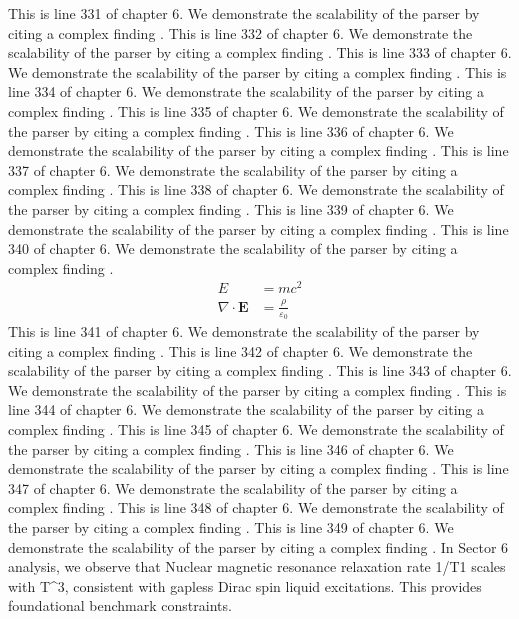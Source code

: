 This is line 331 of chapter 6. We demonstrate the scalability of the parser by citing a complex finding \cite{ref6_331}.
This is line 332 of chapter 6. We demonstrate the scalability of the parser by citing a complex finding \cite{ref6_332}.
This is line 333 of chapter 6. We demonstrate the scalability of the parser by citing a complex finding \cite{ref6_333}.
This is line 334 of chapter 6. We demonstrate the scalability of the parser by citing a complex finding \cite{ref6_334}.
This is line 335 of chapter 6. We demonstrate the scalability of the parser by citing a complex finding \cite{ref6_335}.
This is line 336 of chapter 6. We demonstrate the scalability of the parser by citing a complex finding \cite{ref6_336}.
This is line 337 of chapter 6. We demonstrate the scalability of the parser by citing a complex finding \cite{ref6_337}.
This is line 338 of chapter 6. We demonstrate the scalability of the parser by citing a complex finding \cite{ref6_338}.
This is line 339 of chapter 6. We demonstrate the scalability of the parser by citing a complex finding \cite{ref6_339}.
This is line 340 of chapter 6. We demonstrate the scalability of the parser by citing a complex finding \cite{ref6_340}.
\begin{align*}
  E &= mc^2 \\
  \nabla \cdot \mathbf{E} &= \frac{\rho}{\varepsilon_0}
\end{align*}
This is line 341 of chapter 6. We demonstrate the scalability of the parser by citing a complex finding \cite{ref6_341}.
This is line 342 of chapter 6. We demonstrate the scalability of the parser by citing a complex finding \cite{ref6_342}.
This is line 343 of chapter 6. We demonstrate the scalability of the parser by citing a complex finding \cite{ref6_343}.
This is line 344 of chapter 6. We demonstrate the scalability of the parser by citing a complex finding \cite{ref6_344}.
This is line 345 of chapter 6. We demonstrate the scalability of the parser by citing a complex finding \cite{ref6_345}.
This is line 346 of chapter 6. We demonstrate the scalability of the parser by citing a complex finding \cite{ref6_346}.
This is line 347 of chapter 6. We demonstrate the scalability of the parser by citing a complex finding \cite{ref6_347}.
This is line 348 of chapter 6. We demonstrate the scalability of the parser by citing a complex finding \cite{ref6_348}.
This is line 349 of chapter 6. We demonstrate the scalability of the parser by citing a complex finding \cite{ref6_349}.
In Sector 6 analysis, we observe that Nuclear magnetic resonance relaxation rate 1/T1 scales with T^3, consistent with gapless Dirac spin liquid excitations. This provides foundational benchmark constraints.
